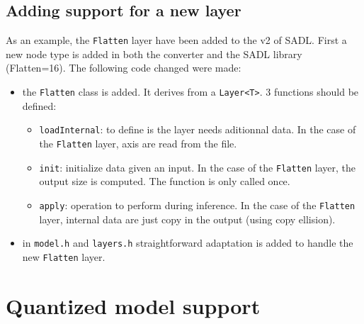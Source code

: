 \documentclass[10pt,a4paper]{article}
\begin{document}
\subsection{Adding support for a new layer}
As an example, the \texttt{Flatten} layer have been added to the v2 of SADL. First a new node type is added in both the converter and the SADL library (\textrm{Flatten=16}).
The following code changed were made:
\begin{itemize}
\item the \texttt{Flatten} class is added. It derives from a \texttt{Layer<T>}. 3 functions should be defined:
\begin{itemize}
\item \texttt{loadInternal}: to define is the layer needs aditionnal data. In the case of the \texttt{Flatten} layer, axis are read from the file.
\item \texttt{init}: initialize data given an input. In the case of the \texttt{Flatten} layer, the output size is computed. The function is only called once.
\item \texttt{apply}: operation to perform during inference. In the case of the \texttt{Flatten} layer, internal data are just copy in the output (using copy ellision). 
\end{itemize}
\item in  \texttt{model.h} and  \texttt{layers.h} straightforward adaptation is added to handle the new \texttt{Flatten} layer.
\end{itemize}

\section{Quantized model support}
\end{document}
